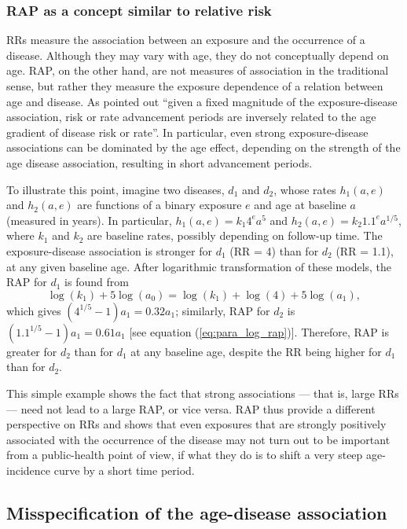 \subsubsection{RAP as a concept similar to relative risk}

RRs measure the association between an exposure and the occurrence of a disease. Although they may vary with age, they do not conceptually depend on age. RAP, on the other hand, are not measures of association in the traditional sense, but rather they measure the exposure dependence of a relation between age and disease. As \citet{brenner_risk_1993} pointed out ``given a fixed magnitude of the exposure-disease association, risk or rate advancement periods are inversely related to the age gradient of disease risk or rate''. In particular, even strong exposure-disease associations can be dominated by the age effect, depending on the strength of the age disease association, resulting in short advancement periods.

To illustrate this point, imagine two diseases, $d_1$ and $d_2$, whose rates $h_1(a,e)$ and $h_2(a,e)$ are functions of a binary exposure $e$ and age at baseline $a$ (measured in years). In particular, $h_1(a,e)=k_1  4^e  a^5$ and $h_2(a,e)=k_2  1.1^e  a^{1/5}$, where $k_1$ and $k_2$ are baseline rates, possibly depending on follow-up time. The exposure-disease association is stronger for $d_1$ (RR = 4) than for $d_2$ (RR = 1.1), at any given baseline age. After logarithmic transformation of these models, the RAP for $d_1$ is found from
\begin{equation*}
\log\left( k_1 \right) + 5 \log\left(a_0\right) = \log \left(k_1\right) + \log\left(4\right) + 5 \log\left(a_1\right),
\end{equation*}
which gives $(4^{1/5}-1)a_1=0.32 a_1$; similarly, RAP for $d_2$ is $(1.1^{1/5}-1)a_1=0.61 a_1$ [see equation (\ref{eq:para_log_rap})]. Therefore, RAP is greater for $d_2$ than for $d_1$ at any baseline age, despite the RR being higher for $d_1$ than for $d_2$.

This simple example shows the fact that strong associations --- that is, large RRs --- need not lead to a large RAP, or vice versa. RAP thus provide a different perspective on RRs and shows that even exposures that are strongly positively associated with the occurrence of the disease  may not turn out to be important from a public-health point of view, if what they do is to shift a very steep age-incidence curve by a short time period.

\subsection{Misspecification of the age-disease association}

